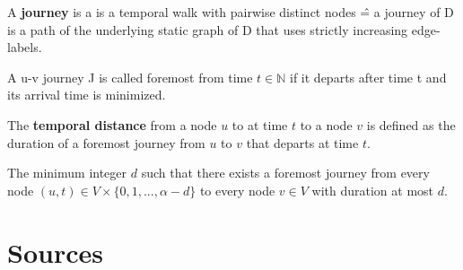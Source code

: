 \documentclass[12pt,a4paper]{article}
\begin{document}
\begin{tcolorbox}[title=Definition: Journey]
  A \textbf{journey} is a is a temporal walk with pairwise distinct nodes \^{=} a journey of D is a path of the underlying static graph of D that uses
strictly increasing edge-labels.
\end{tcolorbox}

\begin{tcolorbox}[title=Definition: Foremost Journey]
  A u-v journey J is called foremost from time $t \in \mathbb{N}$ if it departs after time t and its arrival time is minimized.
\end{tcolorbox}

\begin{tcolorbox}[title=Definition: Temporal distance]
  The \textbf{temporal distance} from a node $u$ to at time $t$ to a node $v$ is defined as the duration of a foremost journey from $u$ to $v$ that departs at time $t$.
\end{tcolorbox}
\begin{tcolorbox}[title=Definition: Temporal diameter $d$]
  The minimum integer $d$ such that there exists a foremost journey from every node $(u, t) \in V \times \{ 0, 1, ..., \alpha - d \}$  to every node $v \in V$ with duration at most $d$.
\end{tcolorbox}

\section{Sources}
\end{document}
